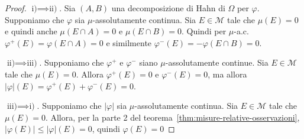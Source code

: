 \begin{proof}
    \(\text{i)} \implies \text{ii)}\). Sia \((A, B)\) una decomposizione di Hahn
    di \(\Omega\) per \(\varphi \). Supponiamo che \(\varphi\) sia
    \(\mu\)-assolutamente continua. Sia \(E \in \mathcal{M}\) tale che
    \(\mu(E) = 0\) e quindi anche \(\mu(E \cap A) = 0\) e \(\mu(E \cap B) = 0\).
    Quindi per \(\mu\)-a.c.~\(\varphi^{+}(E) =
    \varphi(E \cap A) = 0\) e similmente \(\varphi^{-}(E) = -\varphi(E \cap B) = 0\).

    \(\text{ii)} \implies \text{iii)}\). Supponiamo che \(\varphi^{+}\) e
    \(\varphi^{-}\) siano \(\mu\)-assolutamente continue. Sia \(E \in \mathcal{M}\)
    tale che \(\mu(E) = 0\). Allora \(\varphi^{+}(E) = 0\) e \(\varphi^{-}(E) =
    0\), ma allora \(|\varphi|(E) = \varphi^{+}(E) + \varphi^{-}(E) = 0\).

    \(\text{iii)} \implies \text{i)}\). Supponiamo che \(|\varphi|\) sia
    \(\mu\)-assolutamente continua. Sia \(E \in \mathcal{M}\) tale che \(\mu(E) =
    0\). Allora, per la parte 2 del
    teorema~\ref{thm:misure-relative-osservazioni}, \(|\varphi (E)| \le |\varphi
    |(E) = 0\), quindi \(\varphi (E) = 0\) 
\end{proof}

